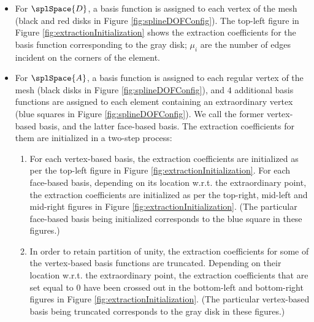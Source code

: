 \documentclass[11pt]{article}
\begin{document}
\begin{itemize}
	\item For $\splSpace{D}$, a basis function is assigned to each vertex of the mesh (black and red disks in Figure \ref{fig:splineDOFConfig}). The top-left figure in Figure \ref{fig:extractionInitialization} shows the extraction coefficients for the basis function corresponding to the gray disk; $\mu_i$ are the number of edges incident on the corners of the element.
	\item For $\splSpace{A}$, a basis function is assigned to each regular vertex of the mesh (black disks in Figure \ref{fig:splineDOFConfig}), and $4$ additional basis functions are assigned to each element containing an extraordinary vertex (blue squares in Figure \ref{fig:splineDOFConfig}). We call the former vertex-based basis, and the latter face-based basis. The extraction coefficients for them are initialized in a two-step process:
	\begin{enumerate}
		\item For each vertex-based basis, the extraction coefficients are initialized as per the top-left figure in Figure \ref{fig:extractionInitialization}. For each face-based basis, depending on its location w.r.t. the extraordinary point, the extraction coefficients are initialized as per the top-right, mid-left and mid-right figures in Figure \ref{fig:extractionInitialization}. (The particular face-based basis being initialized corresponds to the blue square in these figures.)
		\item In order to retain partition of unity, the extraction coefficients for some of the vertex-based basis functions are truncated. Depending on their location w.r.t. the extraordinary point, the extraction coefficients that are set equal to $0$ have been crossed out in the bottom-left and bottom-right figures in Figure \ref{fig:extractionInitialization}. (The particular vertex-based basis being truncated corresponds to the gray disk in these figures.)
	\end{enumerate}
\end{itemize}
\end{document}
